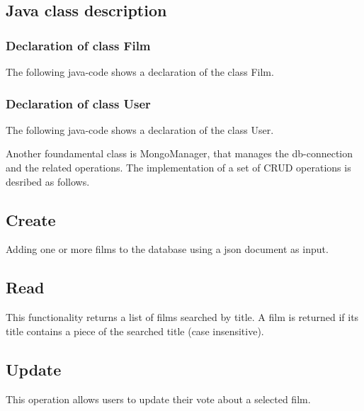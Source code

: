 \documentclass[a4paper, oneside]{article}
\begin{document}
\subsection{Java class description}
\subsubsection{Declaration of class Film}
The following java-code shows a declaration of the class Film.
\vspace{2mm}

\vspace{5mm}

\subsubsection{Declaration of class User}
The following java-code shows a declaration of the class User.
\vspace{2mm}

\vspace{5mm}
Another foundamental class is MongoManager, that manages the db-connection and the related operations.
The implementation of a set of CRUD operations is desribed as follows.


\subsection{Create}
Adding one or more films to the database using a json document as input.
\vspace{2mm}

\vspace{5mm}

\subsection{Read}
This functionality returns a list of films searched by title. A film is returned if its title contains a piece of the searched title (case insensitive).
\vspace{2mm}

\vspace{5mm}

\subsection{Update}
This operation allows users to update their vote about a selected film.
\vspace{2mm}

\vspace{5mm}
\end{document}
